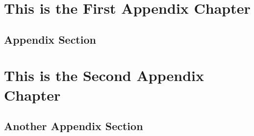 
\chapter{This is the First Appendix Chapter}
\label{sec:ThisIsTheFirstAppendixChapter}

\section{Appendix Section}
\label{sec:AppendixSection}

\chapter{This is the Second Appendix Chapter}
\label{sec:ThisIsTheSecondAppendixChapter}

\section{Another Appendix Section}
\label{sec:AnotherAppendixSection}
